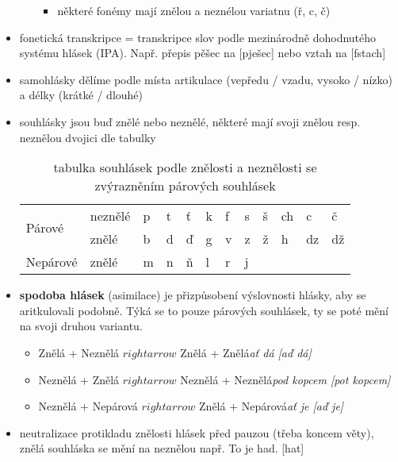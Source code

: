 \documentclass{memoir}
\begin{document}
\begin{itemize}
\begin{enumerate}
\begin{itemize}
				\item některé fonémy mají znělou a neznélou variatnu (ř, c, č)
			\end{itemize}
		\end{enumerate}
	\item fonetická transkripce = transkripce slov podle mezinárodně dohodnutého systému hlásek (IPA). Např. přepis pěšec na [pješec] nebo vztah na [fstach]
	\item samohlásky dělíme podle místa artikulace (vepředu / vzadu, vysoko / nízko) a délky (krátké / dlouhé)
	\item souhlásky jsou buď znělé nebo neznělé, některé mají svoji znělou resp. neznělou dvojici dle tabulky
	\begin{table}[h]
		\centering
		\begin{tabular}{|l|l|l|l|l|l|l|l|l|l|l|l|}
			\hline
			\multirow{2}{*}{Párové} & neznělé & p & t & ť & k & f & s & š & ch & c  & č  \\ 
			
			& znělé   & b & d & ď & g & v & z & ž & h  & dz & dž\\ 
			\hline
			Nepárové                & znělé   & m & n & ň & l & r & j &   &    &    &    \\ 
			\hline
		\end{tabular}
		\caption{tabulka souhlásek podle znělosti a neznělosti se zvýrazněním párových souhlásek}
	\end{table}
	\item \textbf{spodoba hlásek} (asimilace) je přizpůsobení výslovnosti hlásky, aby se aritkulovali podobně. Týká se to pouze párových souhlásek, ty se poté mění na svoji druhou variantu.
	\begin{itemize}
		\item Znělá + Neznělá $rightarrow$ Znělá + Znělá\hfill\textit{ať dá [aď dá]}
		\item Neznělá + Znělá $rightarrow$ Neznělá + Neznělá\hfill\textit{pod kopcem [pot kopcem]}
		\item Neznělá + Nepárová $rightarrow$ Znělá + Nepárová\hfill\textit{ať je [aď je]}
	\end{itemize}
	\item neutralizace protikladu znělosti hlásek před pauzou (třeba koncem věty), znělá souhláska se mění na neznělou např. To je had. [hat]
	\end{itemize}
\end{document}

